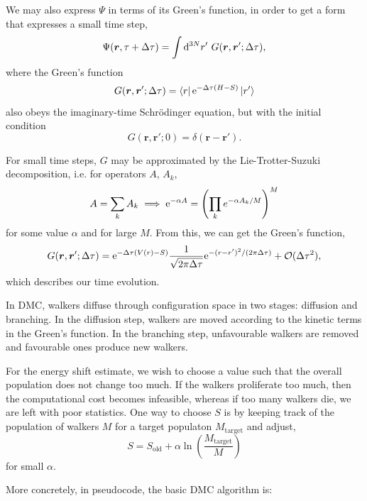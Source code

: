 We may also express $\Psi$ in terms of its Green's function, in order to get a form that expresses a small time step,
\begin{equation}
\Psi(\bm r, \tau+\Delta\tau) = \int\mathrm{d}^{3N}r' \ G(\bm r, \bm r'; \Delta\tau),
\end{equation}
where the Green's function
\begin{equation}
G(\bm r, \bm r'; \Delta\tau) = \bra{r}\mathrm{e}^{-\Delta\tau(H-S)}\ket{r'}
\end{equation}
also obeys the imaginary-time Schr\"odinger equation, but with the initial condition
\begin{equation}
    G(\bm r, \bm r'; 0) = \delta(\bm r-\bm r').
\end{equation}

For small time steps, $G$ may be approximated by the Lie-Trotter-Suzuki decomposition,\supercite{lieTheorie1970,trotterProduct1959,suzukiGeneralized1976} i.e. for operators $A$, $A_k$,
\begin{equation}
    A = \sum_kA_k \implies \mathrm{e}^{-\alpha A} = \left( \prod_k e^{-\alpha A_k/M} \right)^M
\end{equation}
for some value $\alpha$ and for large $M$. From this, we can get the Green's function,
\begin{equation}
    G(\bm r, \bm r'; \Delta\tau) = \mathrm{e}^{-\Delta\tau(V(r)-S)}\frac{1}{\sqrt{2\pi\Delta\tau}}\mathrm{e}^{-(r - r')^2/(2\pi\Delta\tau)}+\mathcal{O}(\Delta\tau^2),
\end{equation}
which describes our time evolution.

In \gls{DMC}, walkers diffuse through configuration space in two stages: diffusion and branching. In the diffusion step, walkers are moved according to the kinetic terms in the Green's function. In the branching step, unfavourable walkers are removed and favourable ones produce new walkers.

For the energy shift estimate, we wish to choose a value such that the overall population does not change too much. If the walkers proliferate too much, then the computational cost becomes infeasible, whereas if too many walkers die, we are left with poor statistics. One way to choose $S$ is by keeping track of the population of walkers $M$ for a target populaton $M_\mathrm{target}$ and adjust,
\begin{equation}
    S = S_\mathrm{old} + \alpha\ln\left(\frac{M_\mathrm{target}}{M}\right)
\end{equation}
for small $\alpha$.

More concretely, in pseudocode, the basic \gls{DMC} algorithm is:

